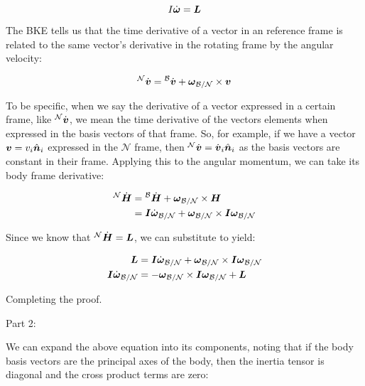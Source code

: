 \begin{equation}
    I \dot{\boldsymbol{\omega}} = \boldsymbol{L}
\end{equation}

The BKE tells us that the time derivative of a vector in an reference frame is related to the same vector's derivative in the rotating frame by the angular velocity:

\begin{equation}
    {}^\mathcal{N}\dot{\boldsymbol{v}} = {}^\mathcal{B}\dot{\boldsymbol{v}} + \boldsymbol{\omega}_\mathcal{B/N} \times \boldsymbol{v}
\end{equation}

To be specific, when we say the derivative of a vector expressed in a certain frame, like ${}^\mathcal{N}\dot{\boldsymbol{v}}$, we mean the time derivative of the vectors elements when expressed in the basis vectors of that frame. So, for example, if we have a vector $\boldsymbol{v} = v_i \hat{\boldsymbol{n}}_i$ expressed in the $\mathcal{N}$ frame, then ${}^\mathcal{N}\dot{\boldsymbol{v}} = \dot{\boldsymbol{v}}_i \hat{\boldsymbol{n}}_i$ as the basis vectors are constant in their frame. Applying this to the angular momentum, we can take its body frame derivative:

\begin{align*}
    {}^\mathcal{N}\dot{\boldsymbol{H}} &= {}^\mathcal{B}\dot{\boldsymbol{H}} + \boldsymbol{\omega}_\mathcal{B/N} \times \boldsymbol{H} \\
    &= \boldsymbol{I} \dot{\boldsymbol{\omega}}_\mathcal{B/N} + \boldsymbol{\omega}_\mathcal{B/N} \times \boldsymbol{I} \boldsymbol{\omega}_\mathcal{B/N} \\
\end{align*}

Since we know that ${}^\mathcal{N}\dot{\boldsymbol{H}} = \boldsymbol{L}$, we can substitute to yield:

\begin{align*}
    \boldsymbol{L} &= \boldsymbol{I} \dot{\boldsymbol{\omega}}_\mathcal{B/N} + \boldsymbol{\omega}_\mathcal{B/N} \times \boldsymbol{I} \boldsymbol{\omega}_\mathcal{B/N} \\
    \boldsymbol{I} \dot{\boldsymbol{\omega}}_\mathcal{B/N} &= -\boldsymbol{\omega}_\mathcal{B/N} \times \boldsymbol{I} \boldsymbol{\omega}_\mathcal{B/N} + \boldsymbol{L} \\
\end{align*}

Completing the proof.

Part 2:

We can expand the above equation into its components, noting that if the body basis vectors are the principal axes of the body, then the inertia tensor is diagonal and the cross product terms are zero:

